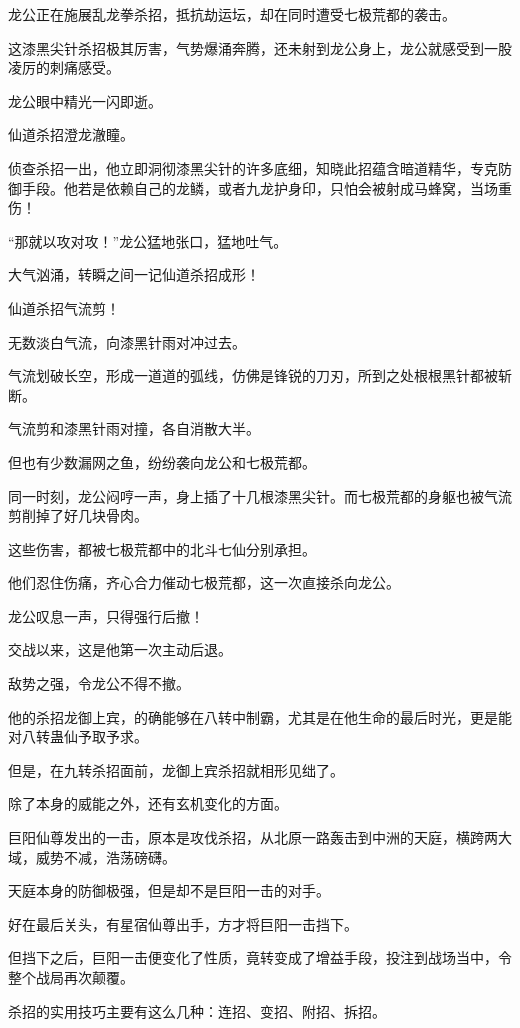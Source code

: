 \begin{this_body}
龙公正在施展乱龙拳杀招，抵抗劫运坛，却在同时遭受七极荒都的袭击。

这漆黑尖针杀招极其厉害，气势爆涌奔腾，还未射到龙公身上，龙公就感受到一股凌厉的刺痛感受。

龙公眼中精光一闪即逝。

仙道杀招澄龙澈瞳。

侦查杀招一出，他立即洞彻漆黑尖针的许多底细，知晓此招蕴含暗道精华，专克防御手段。他若是依赖自己的龙鳞，或者九龙护身印，只怕会被射成马蜂窝，当场重伤！

“那就以攻对攻！”龙公猛地张口，猛地吐气。

大气汹涌，转瞬之间一记仙道杀招成形！

仙道杀招气流剪！

无数淡白气流，向漆黑针雨对冲过去。

气流划破长空，形成一道道的弧线，仿佛是锋锐的刀刃，所到之处根根黑针都被斩断。

气流剪和漆黑针雨对撞，各自消散大半。

但也有少数漏网之鱼，纷纷袭向龙公和七极荒都。

同一时刻，龙公闷哼一声，身上插了十几根漆黑尖针。而七极荒都的身躯也被气流剪削掉了好几块骨肉。

这些伤害，都被七极荒都中的北斗七仙分别承担。

他们忍住伤痛，齐心合力催动七极荒都，这一次直接杀向龙公。

龙公叹息一声，只得强行后撤！

交战以来，这是他第一次主动后退。

敌势之强，令龙公不得不撤。

他的杀招龙御上宾，的确能够在八转中制霸，尤其是在他生命的最后时光，更是能对八转蛊仙予取予求。

但是，在九转杀招面前，龙御上宾杀招就相形见绌了。

除了本身的威能之外，还有玄机变化的方面。

巨阳仙尊发出的一击，原本是攻伐杀招，从北原一路轰击到中洲的天庭，横跨两大域，威势不减，浩荡磅礴。

天庭本身的防御极强，但是却不是巨阳一击的对手。

好在最后关头，有星宿仙尊出手，方才将巨阳一击挡下。

但挡下之后，巨阳一击便变化了性质，竟转变成了增益手段，投注到战场当中，令整个战局再次颠覆。

杀招的实用技巧主要有这么几种：连招、变招、附招、拆招。


\end{this_body}
